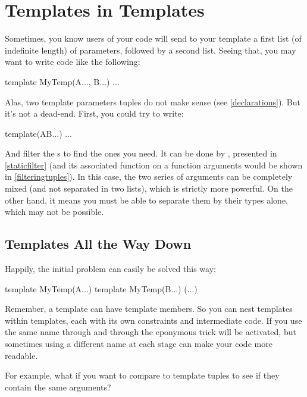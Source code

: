 
\section{Templates in Templates}\label{templatesintemplates}

Sometimes, you know users of your code will send to your template a first list (of indefinite length) of parameters, followed by a second list. Seeing that, you may want to write code like the following:

\begin{dcode}
template MyTemp(A..., B...)
{ ... }
\end{dcode}

Alas, two template parameters tuples do not make sense (see \autoref{declarations}). But it's not a dead-end. First, you could try to write:

\begin{dcode}
template(AB...)
{ ... }
\end{dcode}

And filter the s to find the ones you need. It can be done by , presented in \ref{staticfilter} (and its associated function on a function arguments would be  shown in \ref{filteringtuples}). In this case, the two series of arguments can be completely mixed (and not separated in two lists), which is strictly more powerful. On the other hand, it means you must be able to separate them by their types alone, which may not be possible.

\subsection{Templates All the Way Down}

Happily, the initial problem can easily be solved this way:

\begin{dcode}
template MyTemp(A...)
{
    template MyTemp(B...)
    {
    (...)
    }
}
\end{dcode}

Remember, a template can have template members. So you can nest templates within templates, each with its own constraints and intermediate code. If you use the same name through and through the eponymous trick will be activated, but sometimes using a different name at each stage can make your code more readable.

For example, what if you want to compare to template tuples to see if they contain the same arguments?

